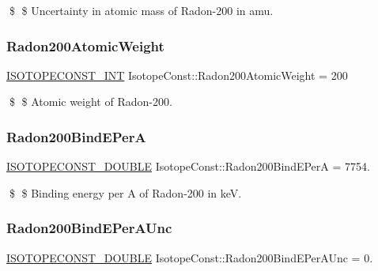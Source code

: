 \$ \$ Uncertainty in atomic mass of Radon-\/200 in amu. \mbox{\label{group___isotope_const-_radon-_rn200_ga0e5f3a367c5238206fc99acc4b6e08d9}} 
\subsubsection{\texorpdfstring{Radon200\+Atomic\+Weight}{Radon200AtomicWeight}}
{\footnotesize\ttfamily \mbox{\hyperlink{group___isotope_const-_macros_ga5f18360b3e99483a35c32d789e62621c}{I\+S\+O\+T\+O\+P\+E\+C\+O\+N\+S\+T\+\_\+\+I\+NT}} Isotope\+Const\+::\+Radon200\+Atomic\+Weight = 200}

\$ \$ Atomic weight of Radon-\/200. \mbox{\label{group___isotope_const-_radon-_rn200_gaab3077d85f0ec22f05f4ef21d71c7577}} 
\subsubsection{\texorpdfstring{Radon200\+Bind\+E\+PerA}{Radon200BindEPerA}}
{\footnotesize\ttfamily \mbox{\hyperlink{group___isotope_const-_macros_ga8f45a7272ce02c0b4c65c44636ed719a}{I\+S\+O\+T\+O\+P\+E\+C\+O\+N\+S\+T\+\_\+\+D\+O\+U\+B\+LE}} Isotope\+Const\+::\+Radon200\+Bind\+E\+PerA = 7754.}

\$ \$ Binding energy per A of Radon-\/200 in keV. \mbox{\label{group___isotope_const-_radon-_rn200_ga5035656b831c31b29a0bfd8e131ad266}} 
\subsubsection{\texorpdfstring{Radon200\+Bind\+E\+Per\+A\+Unc}{Radon200BindEPerAUnc}}
{\footnotesize\ttfamily \mbox{\hyperlink{group___isotope_const-_macros_ga8f45a7272ce02c0b4c65c44636ed719a}{I\+S\+O\+T\+O\+P\+E\+C\+O\+N\+S\+T\+\_\+\+D\+O\+U\+B\+LE}} Isotope\+Const\+::\+Radon200\+Bind\+E\+Per\+A\+Unc = 0.}

